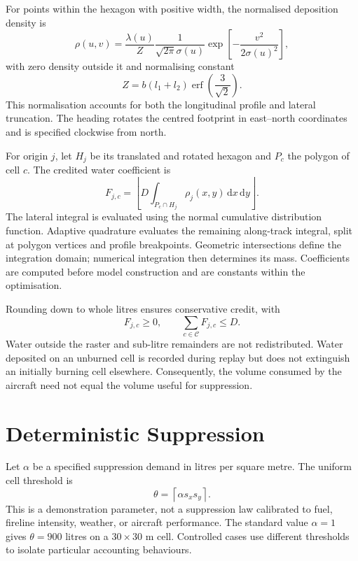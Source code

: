 For points within the hexagon with positive width, the normalised deposition density is
\begin{equation}
    \rho(u,v)=\frac{\lambda(u)}{Z}
    \frac{1}{\sqrt{2\pi}\sigma(u)}
    \exp\!\left[-\frac{v^2}{2\sigma(u)^2}\right],
    \label{eq:static-density}
\end{equation}
with zero density outside it and normalising constant
\begin{equation}
    Z=b(l_1+l_2)\operatorname{erf}\!\left(\frac{3}{\sqrt{2}}\right).
\end{equation}
This normalisation accounts for both the longitudinal profile and lateral truncation. The heading rotates the centred footprint in east--north coordinates and is specified clockwise from north.

For origin $j$, let $H_j$ be its translated and rotated hexagon and $P_c$ the polygon of cell $c$. The credited water coefficient is
\begin{equation}
    F_{j,c}=\left\lfloor
        D\int_{P_c\cap H_j}\rho_j(x,y)\,\mathrm{d}x\,\mathrm{d}y
    \right\rfloor.
    \label{eq:static-deposition}
\end{equation}
The lateral integral is evaluated using the normal cumulative distribution function. Adaptive quadrature evaluates the remaining along-track integral, split at polygon vertices and profile breakpoints. Geometric intersections define the integration domain; numerical integration then determines its mass. Coefficients are computed before model construction and are constants within the optimisation.

Rounding down to whole litres ensures conservative credit, with
\begin{equation}
    F_{j,c}\geq0,
    \qquad\sum_{c\in\mathcal{C}}F_{j,c}\leq D.
\end{equation}
Water outside the raster and sub-litre remainders are not redistributed. Water deposited on an unburned cell is recorded during replay but does not extinguish an initially burning cell elsewhere. Consequently, the volume consumed by the aircraft need not equal the volume useful for suppression.

\section{Deterministic Suppression}
\label{sec:method-suppression}

Let $\alpha$ be a specified suppression demand in litres per square metre. The uniform cell threshold is
\begin{equation}
    \theta=\left\lceil\alpha s_xs_y\right\rceil.
\end{equation}
This is a demonstration parameter, not a suppression law calibrated to fuel, fireline intensity, weather, or aircraft performance. The standard value $\alpha=1$ gives $\theta=900$ litres on a $30\times30$ m cell. Controlled cases use different thresholds to isolate particular accounting behaviours.

